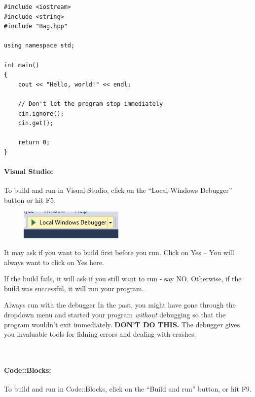 \begin{lstlisting}[style=code]
#include <iostream>
#include <string>
#include "Bag.hpp"

using namespace std;

int main()
{
    cout << "Hello, world!" << endl;

    // Don't let the program stop immediately
    cin.ignore();
    cin.get();

    return 0;
}
\end{lstlisting}

            \paragraph{Visual Studio:} To build and run in Visual Studio, click on the ``Local Windows Debugger'' button or hit F5.
        
            \begin{figure}[h]
                \centering
                \includegraphics{images-2018-01/vs-play.png}
            \end{figure}

            It may ask if you want to build first before you run. Click on Yes -- You will always want to click on Yes here.

            If the build fails, it will ask if you still want to run - say NO. Otherwise, if the build was successful, it will run your program.

            \begin{error}{Always run with the debugger}
                In the past, you might have gone through the dropdown menu and
                started your program \textit{without} debugging so that the program
                wouldn't exit immediately. \textbf{DON'T DO THIS.}
                The debugger gives you invaluable tools for fidning errors and dealing
                with crashes.
            \end{error}

            ~\\
            \paragraph{Code::Blocks:} To build and run in Code::Blocks, click on the ``Build and run'' button, or hit F9.
            
